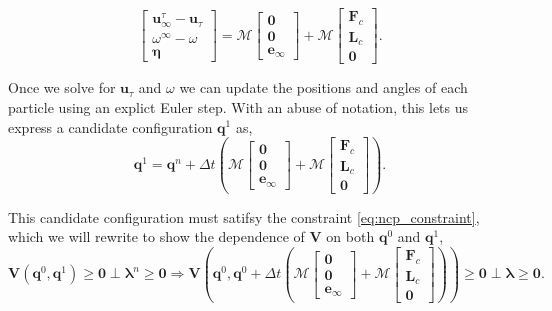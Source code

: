 \documentclass[preprint, 10pt]{elsarticle}
\begin{document}
\[ \begin{bmatrix} \mathbf{u}_\infty^\tau - \mathbf{u}_\tau\\ \omega^\infty - \omega \\\pmb{\eta}\end{bmatrix} = \mathcal{M}\begin{bmatrix}\mathbf{0}\\\mathbf{0}\\\mathbf{e}_\infty\end{bmatrix} + \mathcal{M}\begin{bmatrix}\mathbf{F}_c\\\mathbf{L}_c\\\mathbf{0}\end{bmatrix}.\]

Once we solve for $\mathbf{u}_\tau$ and $\omega$ we can update the positions and angles of each particle using an explict Euler step. With an abuse of notation, this lets us express a candidate configuration $\mathbf{q}^{1}$ as,
\[ \mathbf{q}^{1} = \mathbf{q}^n +  \Delta t\left(\mathcal{M}\begin{bmatrix}\mathbf{0}\\\mathbf{0}\\\mathbf{e}_\infty\end{bmatrix} + \mathcal{M}\begin{bmatrix}\mathbf{F}_c\\\mathbf{L}_c\\\mathbf{0}\end{bmatrix}\right).\]

This candidate configuration must satifsy the constraint \eqref{eq:ncp_constraint}, which we will rewrite to show the dependence of $\mathbf{V}$ on both $\mathbf{q}^0$ and $\mathbf{q}^{1}$,
\begin{equation}\label{eq:ncp_new}\mathbf{V}(\mathbf{q}^0,\mathbf{q}^{1})\geq \mathbf{0}\perp \pmb{\lambda}^n\geq \mathbf{0} \Rightarrow  \mathbf{V}\left(\mathbf{q}^0, \mathbf{q}^0 +  \Delta t\left(\mathcal{M}\begin{bmatrix}\mathbf{0}\\\mathbf{0}\\\mathbf{e}_\infty\end{bmatrix} + \mathcal{M}\begin{bmatrix}\mathbf{F}_c\\\mathbf{L}_c\\\mathbf{0}\end{bmatrix}\right)\right) \geq \mathbf{0} \perp\pmb{\lambda}\geq \mathbf{0} .\end{equation}
\end{document}
